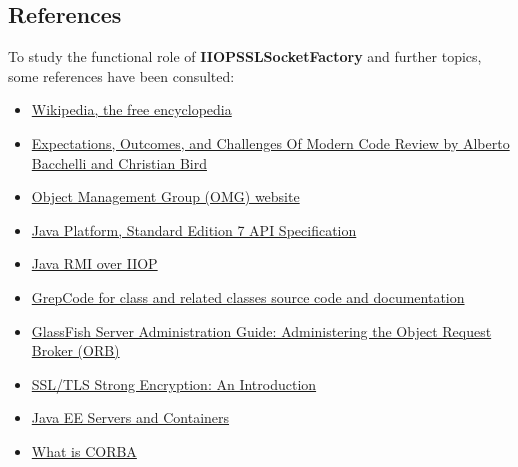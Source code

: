 \subsection{References}
To study the functional role of \textbf{IIOPSSLSocketFactory} and further topics, some references have been consulted:
\begin{itemize}
	\item \href{https://www.wikipedia.org/}{Wikipedia, the free encyclopedia}
	\item \href{http://research.microsoft.com/pubs/180283/ICSE\%202013-codereview.pdf}{Expectations, Outcomes, and Challenges Of Modern Code Review by Alberto Bacchelli and Christian Bird}
	\item \href{http://www.omg.org/}{Object Management Group (OMG) website}
	\item \href{http://docs.oracle.com/javase/7/docs/api/overview-summary.html}{Java Platform, Standard Edition 7 API Specification}
	\item \href{http://docs.oracle.com/javase/7/docs/technotes/guides/rmi-iiop/index.html}{Java RMI over IIOP}
	\item \href{http://grepcode.com/file/repo1.maven.org/maven2/org.glassfish.main.orb/orb-iiop/4.0/org/glassfish/enterprise/iiop/impl/IIOPSSLSocketFactory.java}{GrepCode for class and related classes source code and documentation}  
	\item \href{http://docs.oracle.com/cd/E26576_01/doc.312/e24928/orb.htm\#GSADG00018}{GlassFish Server Administration Guide: Administering the Object Request Broker (ORB)}
	\item \href{https://httpd.apache.org/docs/trunk/ssl/ssl_intro.html}{SSL/TLS Strong Encryption: An Introduction}
	\item \href{https://docs.oracle.com/javaee/7/firstcup/java-ee002.htm}{Java EE Servers and Containers}
	\item 
	\href{http://franz.com/resources/corba/white_papers/corba_white_paper.lhtml}{What is CORBA}
\end{itemize}



